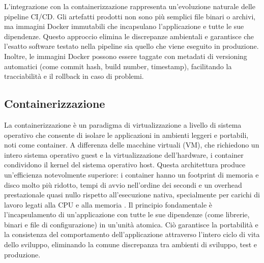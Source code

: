 \documentclass[12pt,a4paper,openright,twoside]{book}
\begin{document}
L'integrazione con la containerizzazione rappresenta un'evoluzione naturale delle pipeline CI/CD. Gli artefatti prodotti non sono più semplici file binari o archivi, ma immagini Docker immutabili che incapsulano l'applicazione e tutte le sue dipendenze. Questo approccio elimina le discrepanze ambientali e garantisce che l'esatto software testato nella pipeline sia quello che viene eseguito in produzione. Inoltre, le immagini Docker possono essere taggate con metadati di versioning automatici (come commit hash, build number, timestamp), facilitando la tracciabilità e il rollback in caso di problemi.

\subsection{Containerizzazione}
La containerizzazione è un paradigma di virtualizzazione a livello di sistema operativo che consente di isolare le applicazioni in ambienti leggeri e portabili, noti come container. A differenza delle macchine virtuali (VM), che richiedono un intero sistema operativo guest e la virtualizzazione dell'hardware, i container condividono il kernel del sistema operativo host. Questa architettura produce un'efficienza notevolmente superiore: i container hanno un footprint di memoria e disco molto più ridotto, tempi di avvio nell'ordine dei secondi e un overhead prestazionale quasi nullo rispetto all'esecuzione nativa, specialmente per carichi di lavoro legati alla CPU e alla memoria \cite{moravcik2024experimental}. Il principio fondamentale è l'incapsulamento di un'applicazione con tutte le sue dipendenze (come librerie, binari e file di configurazione) in un'unità atomica. Ciò garantisce la portabilità e la consistenza del comportamento dell'applicazione attraverso l'intero ciclo di vita dello sviluppo, eliminando la comune discrepanza tra ambienti di sviluppo, test e produzione.
\end{document}
